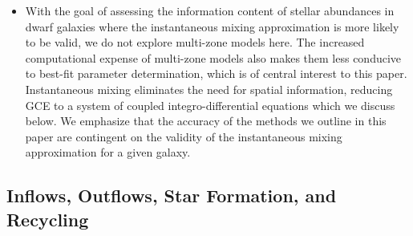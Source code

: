 \documentclass[ms.tex]{subfiles}
\begin{document}
\begin{itemize}
	\item With the goal of assessing the information content of stellar
	abundances in dwarf galaxies where the instantaneous mixing approximation
	is more likely to be valid, we do not explore multi-zone models here.
	The increased computational expense of multi-zone models also makes them
	less conducive to best-fit parameter determination, which is of central
	interest to this paper.
	Instantaneous mixing eliminates the need for spatial information, reducing
	GCE to a system of coupled integro-differential equations which we discuss
	below.
	We emphasize that the accuracy of the methods we outline in this paper are
	contingent on the validity of the instantaneous mixing approximation for a
	given galaxy.

\end{itemize}

\subsection{Inflows, Outflows, Star Formation, and Recycling}
\label{sec:onezone:gas}
\end{document}
